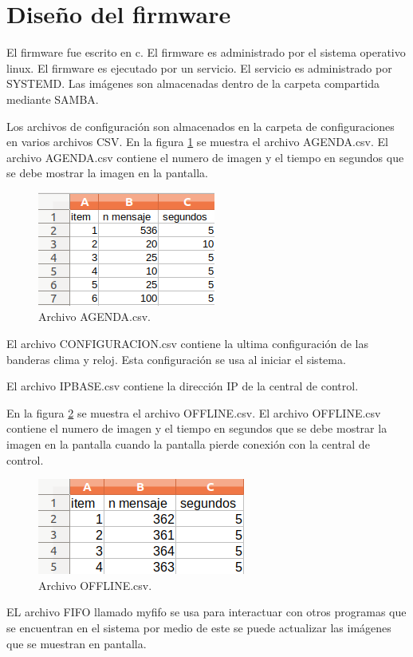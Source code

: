 \section{ Diseño del firmware}
El firmware fue escrito en c. El firmware es administrado por el sistema operativo linux. El firmware es ejecutado por un servicio. El servicio es administrado por SYSTEMD. Las imágenes son almacenadas  dentro de la carpeta compartida mediante SAMBA. 

Los archivos de configuración son almacenados en la carpeta de configuraciones en varios archivos CSV. En la figura \ref{fig:agendacsv} se muestra el archivo AGENDA.csv. El archivo AGENDA.csv contiene el numero de imagen y el tiempo en segundos que se debe mostrar la imagen en la pantalla.

\begin{figure}[htpb]
	\centering
    \includegraphics[scale=1]{Figures/Agenda.png} 
	\caption{Archivo AGENDA.csv.}
	\label{fig:agendacsv}
\end{figure}


El archivo CONFIGURACION.csv contiene la ultima configuración de las banderas clima y reloj. Esta configuración se usa al iniciar el sistema.

El archivo IPBASE.csv contiene la dirección IP de la central de control.

En la figura \ref{fig:offlinecsv} se muestra el archivo OFFLINE.csv. El archivo OFFLINE.csv contiene el numero de imagen y el tiempo en segundos que se debe mostrar la imagen en la pantalla cuando la pantalla pierde conexión con la central de control.

\begin{figure}[htpb]
	\centering
	\includegraphics[scale=1]{Figures/offline.png} 
	\caption{Archivo OFFLINE.csv.}
	\label{fig:offlinecsv}
\end{figure}
EL archivo FIFO llamado myfifo se usa para interactuar con otros programas que se encuentran en el sistema por medio de este se puede actualizar las imágenes que se muestran en pantalla.


